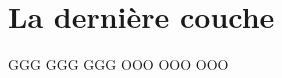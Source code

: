 \chapter{La dernière couche}

{
	\centering
	\RubikFaceRight%
	{G}{G}{G}%
	{G}{G}{G}%
	{G}{G}{G}
	\RubikFaceFront%
	{O}{O}{O}%
	{O}{O}{O}%
	{O}{O}{O}
	\par
}
